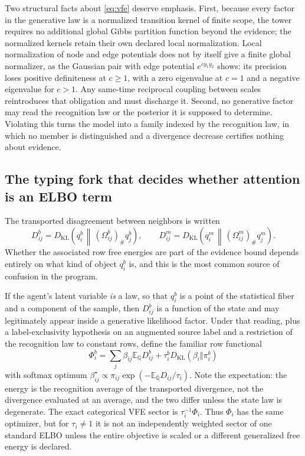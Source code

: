 \documentclass[11pt,letterpaper]{article}
\newcommand{\KL}{D_{\mathrm{KL}}}
\newcommand{\E}{\mathbb E}
\newcommand{\push}{_{\#}}
\begin{document}
Two structural facts about \eqref{eq:vfe} deserve emphasis. First, because every
factor in the generative law is a normalized transition kernel of finite scope, the
tower requires no additional global Gibbs partition function beyond the evidence;
the normalized kernels retain their own declared local normalization. Local
normalization of node and edge potentials does not by itself give a finite global
normalizer, as the Gaussian pair with edge potential $e^{c y_1 y_2}$ shows: its
precision loses positive definiteness at $c\ge1$, with a zero eigenvalue at $c=1$
and a negative eigenvalue for $c>1$. Any same-time reciprocal
coupling between scales reintroduces that obligation and must discharge it. Second,
no generative factor may read the recognition law or the posterior it is supposed to
determine. Violating this turns the model into a family indexed by the recognition
law, in which no member is distinguished and a divergence decrease certifies nothing
about evidence.

\subsection{The typing fork that decides whether attention is an ELBO term}

The transported disagreement between neighbors is written
\begin{equation}
D^b_{ij} = \KL\!\left(q^b_i \,\middle\Vert\, (\Omega^b_{ij})\push q^b_j\right),
\qquad
D^m_{ij} = \KL\!\left(q^m_i \,\middle\Vert\, (\Omega^m_{ij})\push q^m_j\right).
\end{equation}
Whether the associated row free energies are part of the evidence bound depends
entirely on what kind of object $q^b_i$ is, and this is the most common source of
confusion in the program.

If the agent's latent variable \emph{is} a law, so that $q^b_i$ is a point of the
statistical fiber and a component of the sample, then $D^b_{ij}$ is a function of
the state and may legitimately appear inside a generative likelihood factor. Under
that reading, plus a label-exclusivity hypothesis on an augmented source label and a
restriction of the recognition law to constant rows, define the familiar row
functional
\begin{equation}
\Phi^b_i = \sum_j \beta_{ij} \E_{\mathbb Q} D^b_{ij}
+ \tau^b_i \KL(\beta_i \Vert \pi^b_i)
\end{equation}
with softmax optimum
$\beta^\star_{ij} \propto \pi_{ij} \exp(-\E_{\mathbb Q} D_{ij}/\tau_i)$. Note the
expectation: the energy is the recognition average of the transported divergence,
not the divergence evaluated at an average, and the two differ unless the state law
is degenerate. The exact categorical VFE sector is $\tau_i^{-1}\Phi_i$. Thus
$\Phi_i$ has the same optimizer, but for $\tau_i\ne1$ it is not an independently
weighted sector of one standard ELBO unless the entire objective is scaled or a
different generalized free energy is declared.
\end{document}
